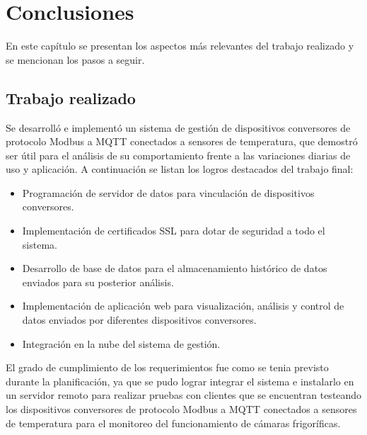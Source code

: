 
\chapter{Conclusiones} %

\label{Chapter5} %

En este capítulo se presentan los aspectos más relevantes del trabajo realizado y
se mencionan los pasos a seguir.



\section{Trabajo realizado}

Se desarrolló e implementó un sistema de gestión de dispositivos conversores de protocolo Modbus a MQTT conectados a sensores de temperatura, que demostró ser útil para el análisis de su comportamiento frente a las variaciones diarias de uso y aplicación.  A continuación se listan los logros destacados del trabajo final:

\begin{itemize}
	\item Programación de servidor de datos para vinculación de dispositivos conversores.
	\item Implementación de certificados SSL para dotar de seguridad a todo el sistema.
	\item Desarrollo de base de datos para el almacenamiento histórico de datos enviados para su posterior análisis. 
	\item Implementación de aplicación web para visualización, análisis y control de datos enviados por diferentes dispositivos conversores.
	\item Integración en la nube del sistema de gestión. 
\end{itemize}

El grado de cumplimiento de los requerimientos fue como se tenia previsto durante la planificación, ya que se pudo lograr integrar el sistema e instalarlo en un servidor remoto para realizar pruebas con clientes que se encuentran testeando los dispositivos conversores de protocolo Modbus a MQTT conectados a sensores de temperatura para el monitoreo del funcionamiento de cámaras frigoríficas.

